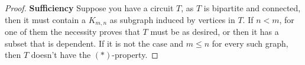 \begin{proof}
    \textbf{Sufficiency}\pn
    Suppose you have a circuit $T$, as $T$ is bipartite and connected, then it must contain a $K_{m, n}$ as subgraph induced by vertices in $T$. 
    If $n < m$, for one of them the necessity proves that $T$ must be as desired, or then it has a subset that is dependent. If it is not the case
    and $m \leq n$ for every such graph, then $T$ doesn't have the $(*)$-property.
\end{proof}